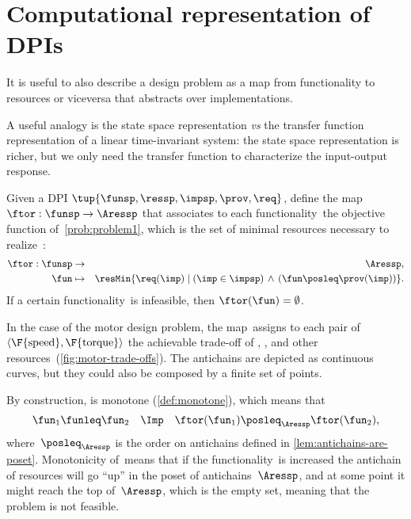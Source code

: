 

\section{Computational representation of DPIs}
\label{sec:solving-representation-of-dpis}

It is useful to also describe a design problem as a map from functionality to resources or viceversa that abstracts over implementations.

A useful analogy is the state space representation \emph{vs} the transfer function representation of a linear time-invariant system: the state space representation is richer, but we only need the transfer function to characterize the input-output response.


\begin{definition}
  \label{def:ftor}
  Given a DPI $\tup{ \funsp,\ressp,\impsp,\prov,\req} $,
  define the map~$\ftor:\funsp\rightarrow\Aressp$ that associates
  to each functionality~\fun the objective function of~\cref{prob:problem1},
  which is the set of minimal resources necessary to realize~\fun:
  \begin{eqnarray*}
    \ftor:\funsp & \rightarrow & \Aressp,\\
    \fun& \mapsto & \resMin\{\req(\imp)\mid\left(\imp\in\impsp\right)\,\wedge\,\left(\fun\posleq\prov(\imp)\right)\}.
  \end{eqnarray*}
  If a certain functionality~\fun is infeasible, then $\ftor(\fun)=\emptyset$.
\end{definition}



\begin{example}
  In the case of the motor design problem, the map~\ftor assigns
  to each pair of $\left\langle \F{\text{speed}},\F{\text{torque}}\right\rangle $
  the achievable trade-off of , , and other resources~(\cref{fig:motor-trade-offs}).
  The antichains are depicted as continuous curves, but they could also
  be composed by a finite set of points.

\end{example}


By construction, \ftor is monotone (\cref{def:monotone}), which means that
\[
  \fun_{1}\funleq\fun_{2}\quad\Imp\quad\ftor(\fun_{1})\posleq_{\Aressp}\ftor(\fun_{2}),
\]
where~$\posleq_{\Aressp}$ is the order on antichains defined in
\cref{lem:antichains-are-poset}.
Monotonicity of~\ftor means that if the functionality~\fun is increased the antichain of resources will go ``up'' in the poset of antichains~$\Aressp$, and at some point it might reach the top of~$\Aressp$, which is the empty set, meaning that the problem is not feasible.




